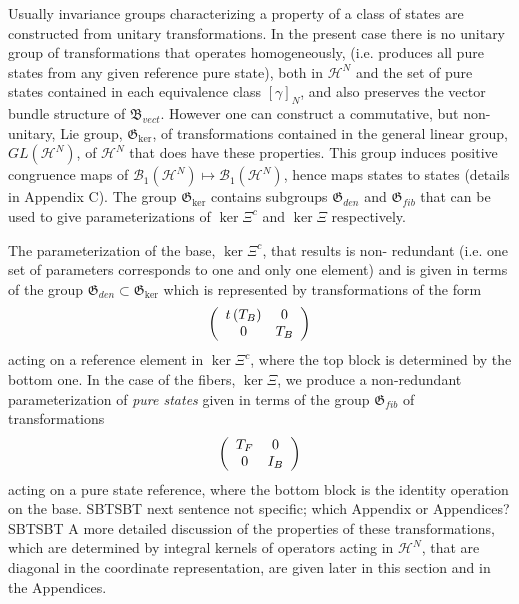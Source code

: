 \documentclass[aps,preprint]{revtex4}%
\begin{document}
Usually invariance groups characterizing a property of a class of states are
constructed from unitary transformations. In the present case there is no
unitary group of transformations that operates homogeneously, (i.e. produces
all pure states from any given reference pure state), both in $\mathcal{H}%
^{N}$ and the set of pure states contained in each equivalence class $\left[
\gamma\right]  _{N}$, and also preserves the vector bundle structure of
$\mathfrak{B}_{vect}$. However one can construct a commutative, but
non-unitary, Lie group, $\mathfrak{G}_{\ker}$, of transformations contained in
the general linear group, $GL\left(  \mathcal{H}^{N}\right)  $, of
$\mathcal{H}^{N}$ that does have these properties. This group induces positive
congruence maps of $\mathcal{B}_{1}\left(  \mathcal{H}^{N}\right)
\mapsto\mathcal{B}_{1}\left(  \mathcal{H}^{N}\right)  $, hence maps states to
states (details in Appendix C). The group $\mathfrak{G}_{\ker}$ contains
subgroups $\mathfrak{G}_{den}$ and $\mathfrak{G}_{fib}$ that can be used to
give parameterizations of $\ker\Xi^{c}$ and $\ker\Xi$ respectively.

The parameterization of the base, $\ker\Xi^{c}$, that results is non-
redundant (i.e. one set of parameters corresponds to one and only one element)
and is given in terms of the group $\mathfrak{G}_{den}\subset\mathfrak{G}%
_{\ker}$ which is represented by transformations of the form
\begin{equation}
\left(
\begin{array}
[c]{cc}%
t\left(  T_{B}\right)  & 0\\
0 & T_{B}%
\end{array}
\right)
\end{equation}
acting on a reference element in $\ker\Xi^{c}$, where the top block is
determined by the bottom one. In the case of the fibers, $\ker\Xi$, we produce
a non-redundant parameterization of \textit{pure states }given in terms of the
group $\mathfrak{G}_{fib}$ of transformations
\begin{equation}
\left(
\begin{array}
[c]{cc}%
T_{F} & 0\\
0 & I_{B}%
\end{array}
\right)
\end{equation}
acting on a pure state reference, where the bottom block is the identity
operation on the base. SBTSBT next sentence not specific; which Appendix or
Appendices? SBTSBT A more detailed discussion of the properties of these
transformations, which are determined by integral kernels of operators acting
in $\mathcal{H}^{N}$, that are diagonal in the coordinate representation, are
given later in this section and in the Appendices.
\end{document}
